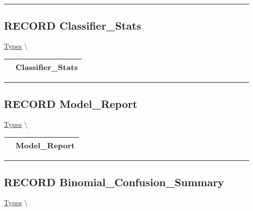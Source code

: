 \par


\rule{\linewidth}{0.5pt}
\subsection*{\textsf{\colorbox{headtoc}{\color{white} RECORD}
Classifier\_Stats}}

\hypertarget{ecldoc:logisticregression.types.classifier_stats}{}
\hspace{0pt} \hyperlink{ecldoc:LogisticRegression.Types}{Types} \textbackslash 

{\renewcommand{\arraystretch}{1.5}
\begin{tabularx}{\textwidth}{|>{\raggedright\arraybackslash}l|X|}
\hline
\hspace{0pt}\mytexttt{\color{red} } & \textbf{Classifier\_Stats} \\
\hline
\end{tabularx}
}

\par


\rule{\linewidth}{0.5pt}
\subsection*{\textsf{\colorbox{headtoc}{\color{white} RECORD}
Model\_Report}}

\hypertarget{ecldoc:logisticregression.types.model_report}{}
\hspace{0pt} \hyperlink{ecldoc:LogisticRegression.Types}{Types} \textbackslash 

{\renewcommand{\arraystretch}{1.5}
\begin{tabularx}{\textwidth}{|>{\raggedright\arraybackslash}l|X|}
\hline
\hspace{0pt}\mytexttt{\color{red} } & \textbf{Model\_Report} \\
\hline
\end{tabularx}
}

\par


\rule{\linewidth}{0.5pt}
\subsection*{\textsf{\colorbox{headtoc}{\color{white} RECORD}
Binomial\_Confusion\_Summary}}

\hypertarget{ecldoc:logisticregression.types.binomial_confusion_summary}{}
\hspace{0pt} \hyperlink{ecldoc:LogisticRegression.Types}{Types} \textbackslash 

